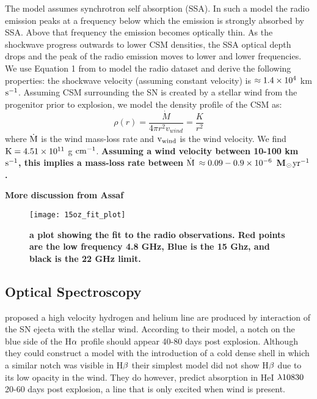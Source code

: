 \documentclass[a4paper,fleqn,usenatbib]{mnras}
\newcommand{\msunperiod}{M$\rm{_{\odot}}$}
\begin{document}
The \citet{1998chevalier} model assumes synchrotron self absorption (SSA). 
In such a model the radio emission peaks at a frequency below which the emission is strongly absorbed by SSA. 
Above that frequency the emission becomes optically thin. 
As the shockwave progress outwards to lower CSM densities, the SSA optical depth drops and the peak of the radio emission moves to lower and lower frequencies. 
We use Equation 1 from \citet{1998chevalier} to model the radio dataset and derive the following properties: the shockwave velocity (assuming constant velocity) is $\rm{\approx 1.4\times10^{4}}$ km $\rm{s^{-1}}$. 
Assuming CSM surrounding the SN is created by a stellar wind from the progenitor prior to explosion, we model the density profile of the CSM as:
\begin{equation} \label{eqn:density}
\rho(r) = \frac{\dot{M}}{4\pi r^{2}v_{wind}} = \frac{K}{r^{2}}
\end{equation}
where $\rm{\dot{M}}$ is the wind mass-loss rate and $\rm{v_{wind}}$ is the wind velocity.
We find $\rm{K = 4.51\times 10^{11}}$ g $\rm{cm^{-1}}$.
\textbf{Assuming a wind velocity between 10-100 km $\rm{s^{-1}}$, this implies a mass-loss rate between $\rm{\dot{M}}$ $\rm{\approx 0.09-0.9\times 10^{-6}}$ \msunperiod $\rm{yr^{-1}}$.}

\textbf{More discussion from Assaf}
\begin{figure}
\begin{center}
\texttt{[image: 15oz\_fit\_plot]}
\caption{\textbf{a plot showing the fit to the radio observations. 
Red points are the low frequency 4.8 GHz, Blue is the 15 Ghz, and black is the 22 GHz limit.}}
\label{fig:radio}
\end{center}
\end{figure}
\subsection{Optical Spectroscopy} \label{sec:cachito}
\citet{2007chugai} proposed a high velocity hydrogen and helium line are produced by interaction of the SN ejecta with the stellar wind. 
According to their model, a notch on the blue side of the H$\rm{\alpha}$ profile should appear 40-80 days post explosion.
Although they could construct a model with the introduction of a cold dense shell in which a similar notch was visible in H$\rm{\beta}$ their simplest model did not show H$\rm{\beta}$ due to its low opacity in the wind.
They do however, predict absorption in HeI $\rm{\lambda10830}$ 20-60 days post explosion, a line that is only excited when wind is present. 
\end{document}
